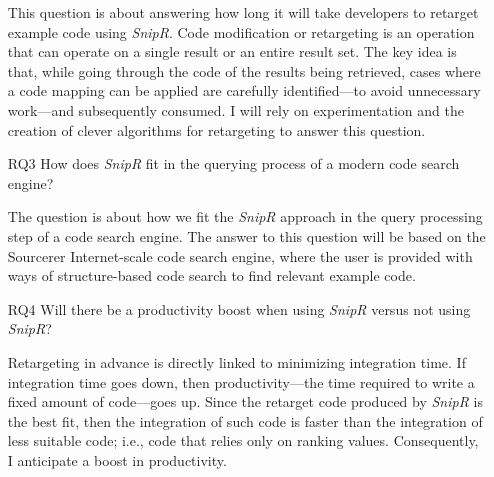 \begin{itemize}
	This question is about answering how long it will take developers to retarget example code 
	using \emph{SnipR}. Code modification or retargeting is an operation that can operate on a single result 
	or an entire result set. The key idea is that, while going through the code of the results being retrieved, 
	cases where a code mapping can be applied are carefully identified---to avoid unnecessary work---and subsequently 
	consumed. I will rely on experimentation and the creation of clever algorithms for retargeting to answer this 
	question.     
	
	
	\item[RQ3] How does \emph{SnipR} fit in the querying process of a modern code search engine?
	
	The question is about how we fit the \emph{SnipR} approach in the query processing step of a 
	code search engine. The answer to this question will be based on the Sourcerer\cite{Bajracharya:2006vn} 
	Internet-scale code search engine, where the user is provided with ways of structure-based code search to 
	find relevant example code.
	
	\item[RQ4] Will there be a productivity boost when using \emph{SnipR} versus not using \emph{SnipR}?
	
	Retargeting in advance is directly linked to minimizing integration time. If integration time goes 
	down, then productivity---the time required to write a fixed amount of code---goes up. Since the 
	retarget code produced by \emph{SnipR} is the best fit, then the integration of such code is faster than the 
	integration of less suitable code; i.e., code that relies only on ranking values. Consequently, I anticipate a 
	boost in productivity.
		
\end{itemize}

